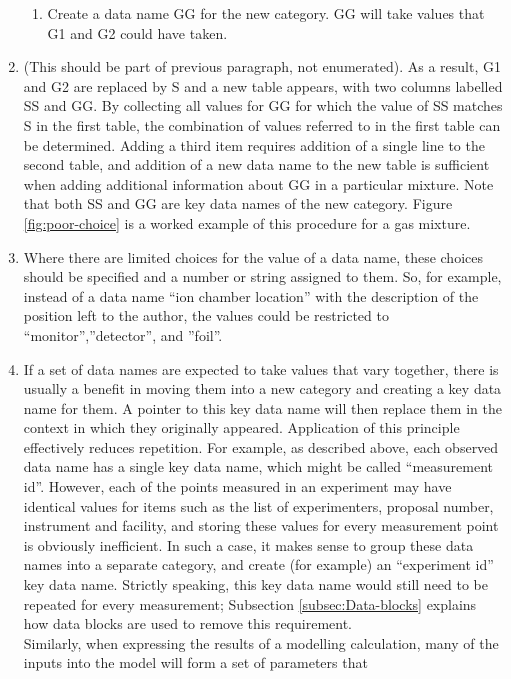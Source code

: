 \begin{enumerate}
\begin{enumerate}
\item Create a data name GG for the new category. GG will take values that
G1 and G2 could have taken. 
\end{enumerate}
\item (This should be part of previous paragraph, not enumerated). As a
result, G1 and G2 are replaced by S and a new table appears, with
two columns labelled SS and GG. By collecting all values for GG for
which the value of SS matches S in the first table, the combination
of values referred to in the first table can be determined. Adding
a third item requires addition of a single line to the second table,
and addition of a new data name to the new table is sufficient when
adding additional information about GG in a particular mixture. Note
that both SS and GG are key data names of the new category. Figure
\ref{fig:poor-choice} is a worked example of this procedure for a
gas mixture.
\item Where there are limited choices for the value of a data name, these
choices should be specified and a number or string assigned to them.
So, for example, instead of a data name ``ion chamber location''
with the description of the position left to the author, the values
could be restricted to ``monitor'',''detector'', and ''foil''.
\item \label{enu:If-a-set}If a set of data names are expected to take values
that vary together, there is usually a benefit in moving them into
a new category and creating a key data name for them. A pointer to
this key data name will then replace them in the context in which
they originally appeared. Application of this principle effectively
reduces repetition. For example, as described above, each observed
data name has a single key data name, which might be called ``measurement
id''. However, each of the points measured in an experiment may have
identical values for items such as the list of experimenters, proposal
number, instrument and facility, and storing these values for every
measurement point is obviously inefficient. In such a case, it makes
sense to group these data names into a separate category, and create
(for example) an ``experiment id'' key data name. Strictly speaking,
this key data name would still need to be repeated for every measurement;
Subsection \ref{subsec:Data-blocks} explains how data blocks are
used to remove this requirement. \\
Similarly, when expressing the results of a modelling calculation,
many of the inputs into the model will form a set of parameters that

\end{enumerate}
